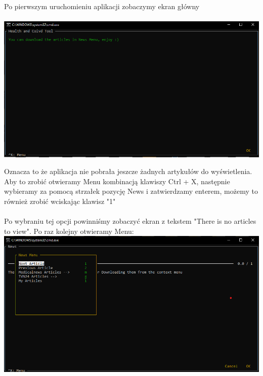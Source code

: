 \documentclass{article}
\begin{document}
Po pierwszym uruchomieniu aplikacji zobaczymy ekran główny\\ \\
\includegraphics[width=\textwidth]{images/main_screen_first_run.png}

Oznacza to że aplikacja nie pobrała jeszcze żadnych artykułów do wyświetlenia. Aby to zrobić otwieramy Menu kombinacją klawiszy Ctrl + X,
następnie wybieramy za pomocą strzałek pozycję News i zatwierdzamy enterem, możemy to również zrobić wciskając klawisz "1"

\paragraph{}
Po wybraniu tej opcji powinniśmy zobaczyć ekran z tekstem "There is no articles to view". Po raz kolejny otwieramy Menu: \\
\includegraphics[width=\textwidth]{images/news_screen_menu.png}

\pagebreak
\end{document}
